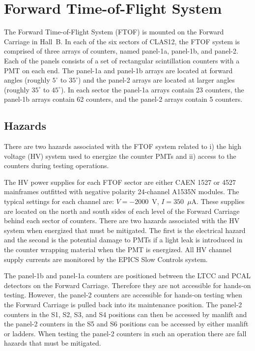 \section{Forward Time-of-Flight System}

The Forward Time-of-Flight System (FTOF) is mounted on the Forward Carriage in Hall~B. 
In each of the six sectors of CLAS12, the FTOF system is comprised of three arrays of 
counters, named panel-1a, panel-1b, and panel-2. Each of the panels consists of a set 
of rectangular scintillation counters with a PMT on each end. The panel-1a and panel-1b 
arrays are located at forward angles (roughly $5^\circ$ to $35^\circ$) and the panel-2 
arrays are located at larger angles (roughly $35^\circ$ to $45^\circ$). In each sector 
the panel-1a arrays contain 23 counters, the panel-1b arrays contain 62 counters, and 
the panel-2 arrays contain 5 counters.

\subsection{Hazards} 

There are two hazards associated with the FTOF system related to i) the high voltage (HV)
system used to energize the counter PMTs and ii) access to the counters during testing 
operations.

The HV power supplies for each FTOF sector are either CAEN 1527 or 4527 mainframes outfitted
with negative polarity 24-channel A1535N modules. The typical settings
for each channel are: $V=-2000$~V, $I=350$~$\mu$A. These supplies are located on the north 
and south sides of each level of the Forward Carriage behind each sector of counters. There 
are two hazards associated with the HV system when energized that must be mitigated. The 
first is the electrical hazard and the second is the potential damage to PMTs if a light 
leak is introduced in the counter wrapping material when the PMT is energized. All HV channel
supply currents are monitored by the EPICS Slow Controls system.

The panel-1b and panel-1a counters are positioned between the LTCC and PCAL detectors on 
the Forward Carriage. Therefore they are not accessible for hands-on testing. However, 
the panel-2 counters are accessible for hands-on testing when the Forward Carriage is 
pulled back into its maintenance position. The panel-2 counters in the S1, S2, S3, and S4 
positions can then be accessed by manlift and the panel-2 counters in the S5 and S6 
positions can be accessed by either manlift or ladders. When testing the panel-2 counters 
in such an operation there are fall hazards that must be mitigated.

